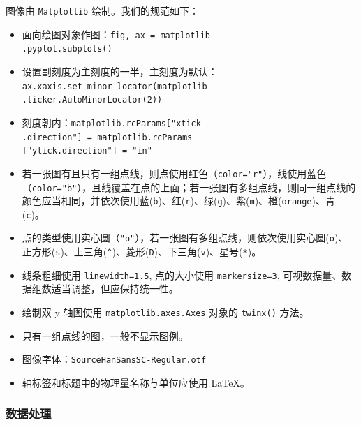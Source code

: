 图像由 \verb|Matplotlib| 绘制。我们的规范如下：
\begin{itemize}
  \item 面向绘图对象作图：\verb|fig, ax = matplotlib|\\\verb|.pyplot.subplots()|
  \item 设置副刻度为主刻度的一半，主刻度为默认：\verb|ax.xaxis.set_minor_locator(matplotlib|\\\verb|.ticker.AutoMinorLocator(2))|
  \item 刻度朝内：\verb|matplotlib.rcParams["xtick|\\\verb|.direction"] = matplotlib.rcParams|\\\verb|["ytick.direction"] = "in"|
  \item 若一张图有且只有一组点线，则点使用红色（\verb|color="r"|），线使用蓝色（\verb|color="b"|），且线覆盖在点的上面；若一张图有多组点线，则同一组点线的颜色应当相同，并依次使用蓝(\verb|b|)、红(\verb|r|)、绿(\verb|g|)、紫(\verb|m|)、橙(\verb|orange|)、青(\verb|c|)。
  \item 点的类型使用实心圆（\verb|"o"|），若一张图有多组点线，则依次使用实心圆(\verb|o|)、正方形(\verb|s|)、上三角(\verb|^|)、菱形(\verb|D|)、下三角(\verb|v|)、星号(\verb|*|)。
  \item 线条粗细使用 \verb|linewidth=1.5|, 点的大小使用 \verb|markersize=3|, 可视数据量、数据组数适当调整，但应保持统一性。
  \item 绘制双 y 轴图使用 \verb|matplotlib.axes.Axes| 对象的 \verb|twinx()| 方法。
  \item 只有一组点线的图，一般不显示图例。
  \item 图像字体：\verb|SourceHanSansSC-Regular.otf|
  \item 轴标签和标题中的物理量名称与单位应使用 \LaTeX{}。
\end{itemize}

\subsubsection{数据处理}

